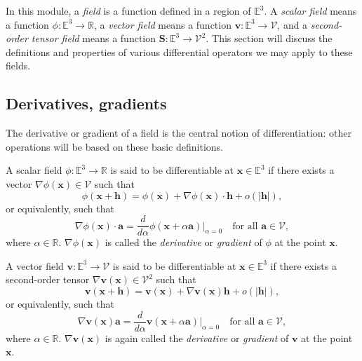 \documentclass[
  letterpaper,
  DIV=11,
  numbers=noendperiod]{scrreprt}
\theoremstyle{plain}
\theoremstyle{remark}
\begin{document}
In this module, a \emph{field} is a function defined in a region of
\({\mathbb{E}}^3\). A \emph{scalar field} means a function
\(\phi:{\mathbb{E}}^3\to{\mathbb{R}}\), a \emph{vector field} means a
function \({\boldsymbol{v}}:{\mathbb{E}}^3\to{\mathcal{V}}\), and a
\emph{second-order tensor field} means a function
\({\boldsymbol{S}}:{\mathbb{E}}^3\to{\mathcal{V}}^2\). This section will
discuss the definitions and properties of various differential operators
we may apply to these fields.

\subsection{Derivatives, gradients}\label{derivatives-gradients}

The derivative or gradient of a field is the central notion of
differentiation: other operations will be based on these basic
definitions.

A scalar field \(\phi:{\mathbb{E}}^3\to{\mathbb{R}}\) is said to be
differentiable at \({\boldsymbol{x}}\in{\mathbb{E}}^3\) if there exists
a vector \(\nabla \phi({\boldsymbol{x}})\in{\mathcal{V}}\) such that
\[\phi({\boldsymbol{x}}+{\boldsymbol{h}}) = \phi({\boldsymbol{x}}) +\nabla \phi({\boldsymbol{x}})\cdot{\boldsymbol{h}}+{o}(|{\boldsymbol{h}}|),\]
or equivalently, such that
\[\nabla\phi({\boldsymbol{x}})\cdot{\boldsymbol{a}}= \frac{d}{d\alpha}\phi({\boldsymbol{x}}+\alpha{\boldsymbol{a}})\bigg|_{\alpha=0}\quad\text{for all }{\boldsymbol{a}}\in{\mathcal{V}},\]
where \(\alpha\in{\mathbb{R}}\). \(\nabla\phi({\boldsymbol{x}})\) is
called the \emph{derivative} or \emph{gradient} of \(\phi\) at the point
\({\boldsymbol{x}}\).

A vector field \({\boldsymbol{v}}:{\mathbb{E}}^3\to{\mathcal{V}}\) is
said to be differentiable at \({\boldsymbol{x}}\in{\mathbb{E}}^3\) if
there exists a second-order tensor
\(\nabla {\boldsymbol{v}}({\boldsymbol{x}})\in{\mathcal{V}}^2\) such
that
\[{\boldsymbol{v}}({\boldsymbol{x}}+{\boldsymbol{h}}) = {\boldsymbol{v}}({\boldsymbol{x}}) +\nabla {\boldsymbol{v}}({\boldsymbol{x}}){\boldsymbol{h}}+{o}(|{\boldsymbol{h}}|),\]
or equivalently, such that
\[\nabla{\boldsymbol{v}}({\boldsymbol{x}}){\boldsymbol{a}}= \frac{d}{d\alpha}{\boldsymbol{v}}({\boldsymbol{x}}+\alpha{\boldsymbol{a}})\bigg|_{\alpha=0}\quad\text{for all }{\boldsymbol{a}}\in{\mathcal{V}},\]
where \(\alpha\in{\mathbb{R}}\).
\(\nabla{\boldsymbol{v}}({\boldsymbol{x}})\) is again called the
\emph{derivative} or \emph{gradient} of \({\boldsymbol{v}}\) at the
point \({\boldsymbol{x}}\).
\end{document}
